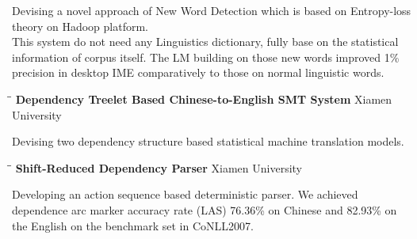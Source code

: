 \documentclass{res}
\begin{document}
\begin{resume}
   Devising a novel approach of New Word Detection which is based on Entropy-loss theory on Hadoop platform.\\
   This system do not need any Linguistics dictionary, fully base on the statistical information of corpus itself.
   The LM building on those new words improved 1\% precision in desktop IME comparatively to those on normal linguistic words.
   \begin{tabbing}
   \hspace{2.5in}\= \hspace{3in}\= \kill %
    {\bf Dependency Treelet Based Chinese-to-English SMT System} \> \>Xiamen University\\
   \end{tabbing}\vspace{-20pt}      %
   Devising two dependency structure based statistical machine translation models. 
   \begin{tabbing}
   \hspace{2.5in}\= \hspace{3in}\= \kill %
    {\bf Shift-Reduced Dependency Parser} \> \>Xiamen University\\
   \end{tabbing}\vspace{-20pt}      %
   Developing an action sequence based deterministic parser.
   We achieved dependence arc marker accuracy rate (LAS) 76.36\% on Chinese and 82.93\% on the English on the benchmark set in CoNLL2007.






\end{resume}
\end{document}
